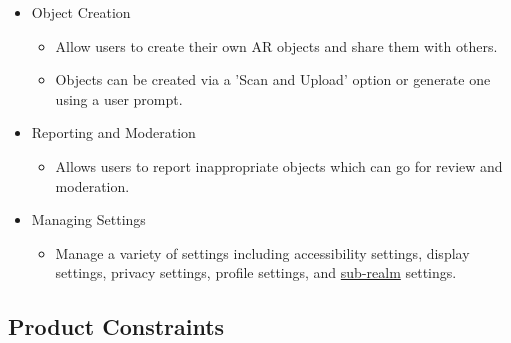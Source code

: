 \documentclass{article}
\begin{document}
\begin{itemize}
    \item Object Creation
          \begin{itemize}
              \item Allow users to create their own AR objects and share them with others.
              \item Objects can be created via a 'Scan and Upload' option or generate one using a user prompt.
          \end{itemize}

    \item Reporting and Moderation
          \begin{itemize}
              \item Allows users to report inappropriate objects which can go for review and moderation.
          \end{itemize}

    \item Managing Settings
          \begin{itemize}
              \item Manage a variety of settings including accessibility settings, display settings, privacy settings, profile settings, and \hyperref[def:sub_realm]{sub-realm} settings.
          \end{itemize}
\end{itemize}
\subsection{Product Constraints}
\end{document}
